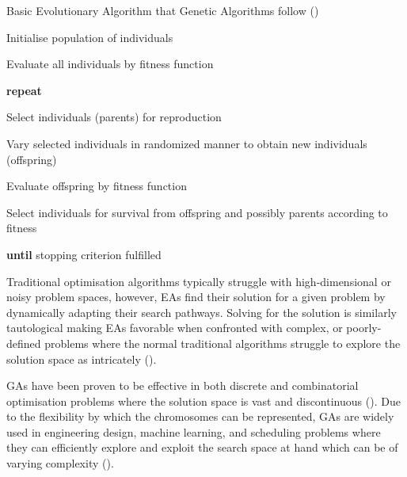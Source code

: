 \parbreak
\begin{algorithm}[H]
	\caption{Basic Evolutionary Algorithm that Genetic Algorithms follow (\cite{back2012handbook})}\label{alg:basic_genetic_algorithm}
	\begin{algorithmic}[1]
	\item Initialise population of individuals
	\item Evaluate all individuals  by fitness function
	\item \textbf{repeat}
	\item \quad Select individuals (parents) for reproduction
	\item \quad Vary selected individuals in randomized manner to obtain new individuals (offspring)
	\item \quad Evaluate offspring by fitness function
	\item \quad Select individuals for survival from offspring and possibly parents according to fitness
	\item \textbf{until} stopping criterion fulfilled
	\end{algorithmic}
\end{algorithm}

\parbreak\noindent Traditional optimisation algorithms typically struggle with high-dimensional or noisy problem spaces, however, EAs find their solution for a given problem by dynamically adapting their search pathways. Solving for the solution is similarly tautological making EAs favorable when confronted with complex, or poorly-defined problems where the normal traditional algorithms struggle to explore the solution space as intricately (\cite{intelligentOptimization}).

\parbreak\noindent GAs have been proven to be effective in both discrete and combinatorial optimisation problems where the solution space is vast and discontinuous (\cite{book_introduction_to_evolutionary_computing}). Due to the flexibility by which the chromosomes can be represented, GAs are widely used in engineering design, machine learning, and scheduling problems where they can efficiently explore and exploit the search space at hand which can be of varying complexity (\cite{back2012handbook}).

